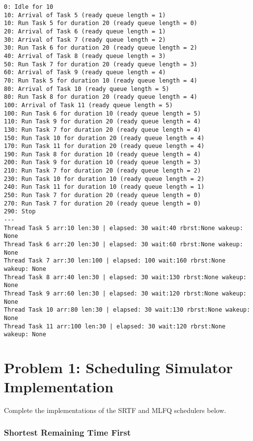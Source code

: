 \documentclass[11pt]{article}
\begin{document}
    \begin{Verbatim}[commandchars=\\\{\}]
0: Idle for 10
10: Arrival of Task 5 (ready queue length = 1)
10: Run Task 5 for duration 20 (ready queue length = 0)
20: Arrival of Task 6 (ready queue length = 1)
30: Arrival of Task 7 (ready queue length = 2)
30: Run Task 6 for duration 20 (ready queue length = 2)
40: Arrival of Task 8 (ready queue length = 3)
50: Run Task 7 for duration 20 (ready queue length = 3)
60: Arrival of Task 9 (ready queue length = 4)
70: Run Task 5 for duration 10 (ready queue length = 4)
80: Arrival of Task 10 (ready queue length = 5)
80: Run Task 8 for duration 20 (ready queue length = 4)
100: Arrival of Task 11 (ready queue length = 5)
100: Run Task 6 for duration 10 (ready queue length = 5)
110: Run Task 9 for duration 20 (ready queue length = 4)
130: Run Task 7 for duration 20 (ready queue length = 4)
150: Run Task 10 for duration 20 (ready queue length = 4)
170: Run Task 11 for duration 20 (ready queue length = 4)
190: Run Task 8 for duration 10 (ready queue length = 4)
200: Run Task 9 for duration 10 (ready queue length = 3)
210: Run Task 7 for duration 20 (ready queue length = 2)
230: Run Task 10 for duration 10 (ready queue length = 2)
240: Run Task 11 for duration 10 (ready queue length = 1)
250: Run Task 7 for duration 20 (ready queue length = 0)
270: Run Task 7 for duration 20 (ready queue length = 0)
290: Stop
---
Thread Task 5 arr:10 len:30 | elapsed: 30 wait:40 rbrst:None wakeup: None
Thread Task 6 arr:20 len:30 | elapsed: 30 wait:60 rbrst:None wakeup: None
Thread Task 7 arr:30 len:100 | elapsed: 100 wait:160 rbrst:None wakeup: None
Thread Task 8 arr:40 len:30 | elapsed: 30 wait:130 rbrst:None wakeup: None
Thread Task 9 arr:60 len:30 | elapsed: 30 wait:120 rbrst:None wakeup: None
Thread Task 10 arr:80 len:30 | elapsed: 30 wait:130 rbrst:None wakeup: None
Thread Task 11 arr:100 len:30 | elapsed: 30 wait:120 rbrst:None wakeup: None

    \end{Verbatim}

    \section{Problem 1: Scheduling Simulator
Implementation}\label{problem-1-scheduling-simulator-implementation}

    Complete the implementations of the SRTF and MLFQ schedulers below.

    \subsubsection{Shortest Remaining Time
First}\label{shortest-remaining-time-first}
\end{document}
